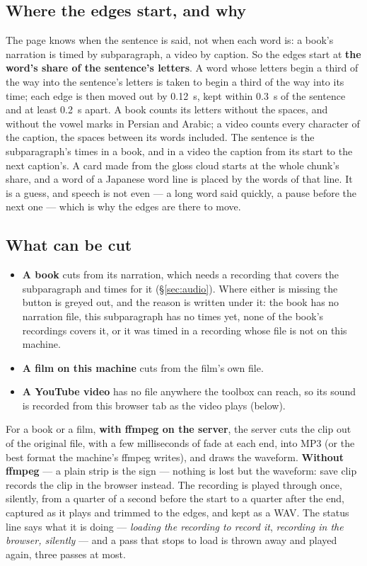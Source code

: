 \documentclass[11pt,oneside]{report}
\newcommand{\menu}[1]{\textsf{#1}}
\begin{document}
\subsection*{Where the edges start, and why}

The page knows when the sentence is said, not when each word is: a book's
narration is timed by subparagraph, a video by caption. So the edges start
at \textbf{the word's share of the sentence's letters}. A word whose
letters begin a third of the way into the sentence's letters is taken to
begin a third of the way into its time; each edge is then moved out by
0.12~s, kept within 0.3~s of the sentence and at least 0.2~s apart. A book
counts its letters without the spaces, and without the vowel marks in
Persian and Arabic; a video counts every character of the caption, the
spaces between its words included. The sentence is the subparagraph's
times in a book, and in a video the caption from its start to the next
caption's. A card made from the gloss cloud
starts at the whole chunk's share, and a word of a Japanese word line is
placed by the words of that line. It is a guess, and speech is not even ---
a long word said quickly, a pause before the next one --- which is why the
edges are there to move.

\subsection*{What can be cut}

\begin{itemize}
\item \textbf{A book} cuts from its narration, which needs a recording that
  covers the subparagraph and times for it (\S\ref{sec:audio}). Where either
  is missing the button is greyed out, and the reason is written under it: the
  book has no narration file, this subparagraph has no times yet, none of
  the book's recordings covers it, or it was timed in a recording whose file
  is not on this machine.
\item \textbf{A film on this machine} cuts from the film's own file.
\item \textbf{A YouTube video} has no file anywhere the toolbox can reach,
  so its sound is recorded from this browser tab as the video plays
  (below).
\end{itemize}

For a book or a film, \textbf{with ffmpeg on the server}, the server cuts
the clip out of the original file, with a few milliseconds of fade at each
end, into MP3 (or the best format the machine's ffmpeg writes), and draws
the waveform.
\textbf{Without ffmpeg} --- a plain strip is the sign --- nothing is lost
but the waveform: \menu{save clip} records the clip in the
browser instead. The recording is played through once, silently, from a
quarter of a second before the start to a quarter after the end, captured
as it plays and trimmed to the edges, and kept as a WAV. The status line
says what it is doing --- \emph{loading the recording to record it},
\emph{recording in the browser, silently} --- and a pass that stops to load
is thrown away and played again, three passes at most.
\end{document}
